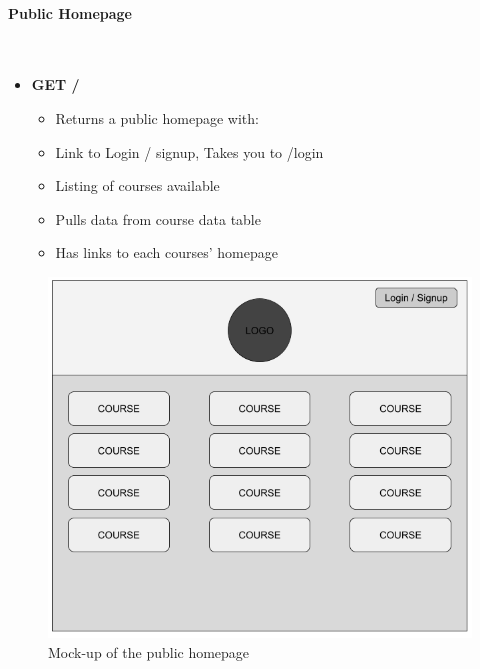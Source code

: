 \documentclass{article}
\begin{document}
\paragraph{Public Homepage}\\ 
\begin{itemize}
    \item \textbf{GET /}
    \begin{itemize}
        \item Returns a public homepage with:
        \item Link to Login / signup, Takes you to /login
        \item Listing of courses available
        \item Pulls data from course data table
        \item Has links to each courses' homepage
    \end{itemize}
\end{itemize}
\begin{figure}[h]
    \caption{Mock-up of the public homepage}
    \includegraphics[width=\textwidth]{public_homepage}
\end{figure}

\newpage
\end{document}
